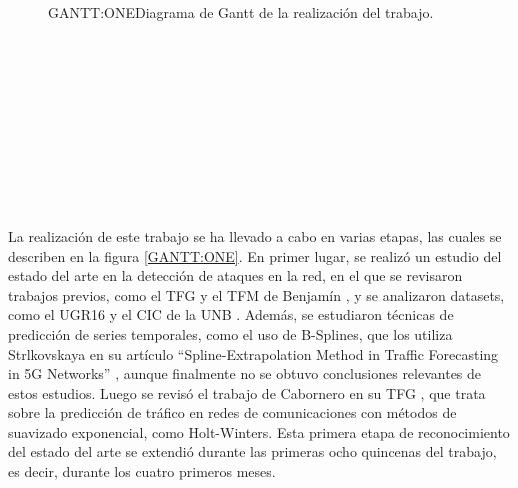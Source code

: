 \begin{figure}[Diagrama de Gantt de la realización del trabajo]{GANTT:ONE}{Diagrama de Gantt de la realización del trabajo.}
\begin{gantt}{1}{24}
     \\
     \\
     \\
     \\
     \\
     \\
     \\
     \\
     \\
\end{gantt}
\end{figure}

La realización de este trabajo se ha llevado a cabo en varias etapas, las cuales se describen en la figura \ref{GANTT:ONE}. 
En primer lugar, se realizó un estudio del estado del arte en la detección de ataques en la red, en el que se revisaron trabajos previos, como el \ac{TFG} y el \ac{TFM} de Benjamín \cite{benjamin2021, benjamin2023}, y se analizaron datasets, como el UGR16 \cite{datosugr16} y el CIC de la UNB \cite{datosunb19}. Además, se estudiaron técnicas de predicción de series temporales, como el uso de B-Splines, que los utiliza Strlkovskaya en su artículo ``Spline-Extrapolation Method in Traffic Forecasting in 5G Networks'' \cite{strelkovskaya2019}, aunque finalmente no se obtuvo conclusiones relevantes de estos estudios. Luego se revisó el trabajo de Cabornero en su \ac{TFG} \cite{cabornero2021}, que trata sobre la predicción de tráfico en redes de comunicaciones con métodos de suavizado exponencial, como Holt-Winters.
Esta primera etapa de reconocimiento del estado del arte se extendió durante las primeras ocho quincenas del trabajo, es decir, durante los cuatro primeros meses.

